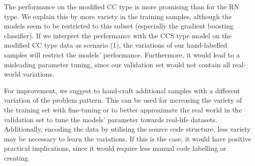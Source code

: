 The performance on the modified CC type is more promising than for the RN type. We explain this by more variety in the training samples, although the models seem to be restricted to this subset (especially the gradient boosting classifier). If we interpret the performance with the CCS type model on the modified CC type data as scenario (1), the variations of our hand-labelled samples will restrict the models' performance. Furthermore, it would lead to a misleading parameter tuning, since our validation set would not contain all real-world variations.

For improvement, we suggest to hand-craft additional samples with a different variation of the problem pattern. This can be used for increasing the variety of the training set with fine-tuning or to better approximate the real world in the validation set to tune the models' parameter towards real-life datasets. Additionally, encoding the data by utilising the source code structure, less variety may be necessary to learn the variations. If this is the case, it would have positive practical implications, since it would require less manual code labelling or creating.



